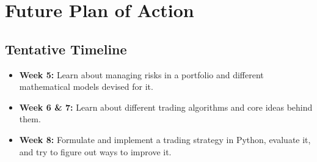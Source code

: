 \chapter{Future Plan of Action}

\section{Tentative Timeline}
\begin{itemize}
  \item \textbf{Week 5:} Learn about managing risks in a portfolio and different mathematical models devised for it.
  \item \textbf{Week 6 \& 7:} Learn about different trading algorithms and core ideas behind them.
  \item \textbf{Week 8:} Formulate and implement a trading strategy in Python, evaluate it, and try to figure out ways to improve it.
\end{itemize}

